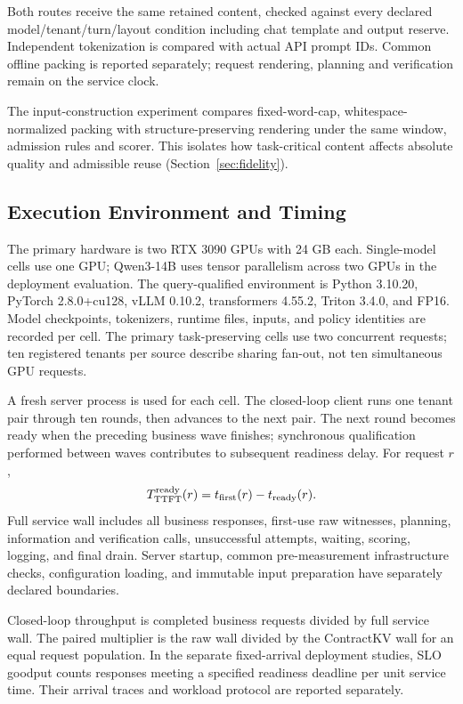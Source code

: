 Both routes receive the same retained content, checked against every declared model/tenant/turn/layout condition including chat template and output reserve. Independent tokenization is compared with actual API prompt IDs. Common offline packing is reported separately; request rendering, planning and verification remain on the service clock.

The input-construction experiment compares fixed-word-cap, whitespace-normalized packing with structure-preserving rendering under the same window, admission rules and scorer. This isolates how task-critical content affects absolute quality and admissible reuse (Section~\ref{sec:fidelity}).

\subsection{Execution Environment and Timing}
The primary hardware is two RTX 3090 GPUs with 24 GB each. Single-model cells use one GPU; Qwen3-14B uses tensor parallelism across two GPUs in the deployment evaluation. The query-qualified environment is Python 3.10.20, PyTorch 2.8.0+cu128, vLLM 0.10.2, transformers 4.55.2, Triton 3.4.0, and FP16. Model checkpoints, tokenizers, runtime files, inputs, and policy identities are recorded per cell. The primary task-preserving cells use two concurrent requests; ten registered tenants per source describe sharing fan-out, not ten simultaneous GPU requests.

A fresh server process is used for each cell. The closed-loop client runs one tenant pair through ten rounds, then advances to the next pair. The next round becomes ready when the preceding business wave finishes; synchronous qualification performed between waves contributes to subsequent readiness delay. For request $r$,
\begin{equation}
 T^{\rm ready}_{\rm TTFT}(r)=t_{\rm first}(r)-t_{\rm ready}(r).
\end{equation}
Full service wall includes all business responses, first-use raw witnesses, planning, information and verification calls, unsuccessful attempts, waiting, scoring, logging, and final drain. Server startup, common pre-measurement infrastructure checks, configuration loading, and immutable input preparation have separately declared boundaries.

Closed-loop throughput is completed business requests divided by full service wall. The paired multiplier is the raw wall divided by the ContractKV wall for an equal request population. In the separate fixed-arrival deployment studies, SLO goodput counts responses meeting a specified readiness deadline per unit service time. Their arrival traces and workload protocol are reported separately.

